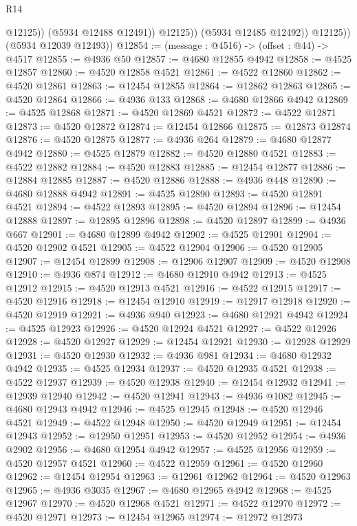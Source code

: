 \begin{lexlean}{R14}
\begin{coremodule}
                      @12125))
                  (@5934 @12488 @12491))
                @12125))
            (@5934 @12485 @12492))
          @12125))
      (@5934 @12039 @12493))
@12854 := (message : @4516) -> (offset : @44) -> @4517
@12855 := @4936 @50
@12857 := @4680 @12855 @4942
@12858 := @4525 @12857
@12860 := @4520 @12858 @4521
@12861 := @4522 @12860
@12862 := @4520 @12861
@12863 := @12454 @12855
@12864 := @12862 @12863
@12865 := @4520 @12864
@12866 := @4936 @133
@12868 := @4680 @12866 @4942
@12869 := @4525 @12868
@12871 := @4520 @12869 @4521
@12872 := @4522 @12871
@12873 := @4520 @12872
@12874 := @12454 @12866
@12875 := @12873 @12874
@12876 := @4520 @12875
@12877 := @4936 @264
@12879 := @4680 @12877 @4942
@12880 := @4525 @12879
@12882 := @4520 @12880 @4521
@12883 := @4522 @12882
@12884 := @4520 @12883
@12885 := @12454 @12877
@12886 := @12884 @12885
@12887 := @4520 @12886
@12888 := @4936 @448
@12890 := @4680 @12888 @4942
@12891 := @4525 @12890
@12893 := @4520 @12891 @4521
@12894 := @4522 @12893
@12895 := @4520 @12894
@12896 := @12454 @12888
@12897 := @12895 @12896
@12898 := @4520 @12897
@12899 := @4936 @667
@12901 := @4680 @12899 @4942
@12902 := @4525 @12901
@12904 := @4520 @12902 @4521
@12905 := @4522 @12904
@12906 := @4520 @12905
@12907 := @12454 @12899
@12908 := @12906 @12907
@12909 := @4520 @12908
@12910 := @4936 @874
@12912 := @4680 @12910 @4942
@12913 := @4525 @12912
@12915 := @4520 @12913 @4521
@12916 := @4522 @12915
@12917 := @4520 @12916
@12918 := @12454 @12910
@12919 := @12917 @12918
@12920 := @4520 @12919
@12921 := @4936 @940
@12923 := @4680 @12921 @4942
@12924 := @4525 @12923
@12926 := @4520 @12924 @4521
@12927 := @4522 @12926
@12928 := @4520 @12927
@12929 := @12454 @12921
@12930 := @12928 @12929
@12931 := @4520 @12930
@12932 := @4936 @981
@12934 := @4680 @12932 @4942
@12935 := @4525 @12934
@12937 := @4520 @12935 @4521
@12938 := @4522 @12937
@12939 := @4520 @12938
@12940 := @12454 @12932
@12941 := @12939 @12940
@12942 := @4520 @12941
@12943 := @4936 @1082
@12945 := @4680 @12943 @4942
@12946 := @4525 @12945
@12948 := @4520 @12946 @4521
@12949 := @4522 @12948
@12950 := @4520 @12949
@12951 := @12454 @12943
@12952 := @12950 @12951
@12953 := @4520 @12952
@12954 := @4936 @2902
@12956 := @4680 @12954 @4942
@12957 := @4525 @12956
@12959 := @4520 @12957 @4521
@12960 := @4522 @12959
@12961 := @4520 @12960
@12962 := @12454 @12954
@12963 := @12961 @12962
@12964 := @4520 @12963
@12965 := @4936 @3035
@12967 := @4680 @12965 @4942
@12968 := @4525 @12967
@12970 := @4520 @12968 @4521
@12971 := @4522 @12970
@12972 := @4520 @12971
@12973 := @12454 @12965
@12974 := @12972 @12973

\end{coremodule}
\end{lexlean}
